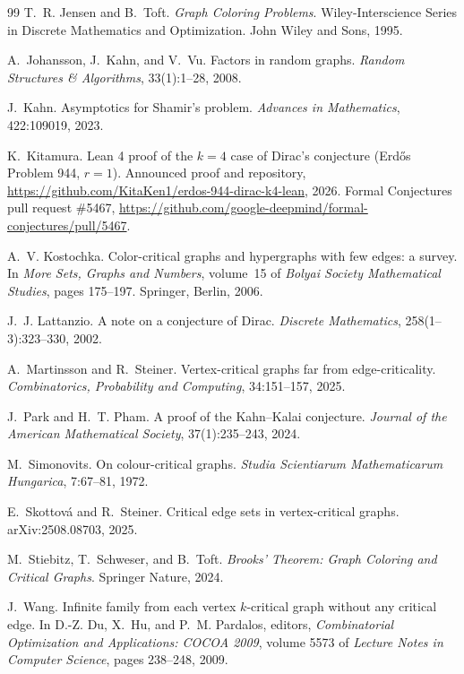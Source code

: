 \documentclass[11pt,letterpaper]{article}
\numberwithin{equation}{section}
\theoremstyle{plain}
\theoremstyle{definition}
\theoremstyle{remark}
\begin{document}
\begin{thebibliography}{99}
T.~R. Jensen and B.~Toft.
\emph{Graph Coloring Problems}.
Wiley-Interscience Series in Discrete Mathematics and Optimization. John Wiley and Sons, 1995.

A.~Johansson, J.~Kahn, and V.~Vu.
Factors in random graphs.
\emph{Random Structures \& Algorithms}, 33(1):1--28, 2008.

J.~Kahn.
Asymptotics for Shamir's problem.
\emph{Advances in Mathematics}, 422:109019, 2023.

K.~Kitamura.
Lean 4 proof of the $k=4$ case of Dirac's conjecture (Erd\H{o}s Problem 944, $r=1$).
Announced proof and repository, \url{https://github.com/KitaKen1/erdos-944-dirac-k4-lean}, 2026.
Formal Conjectures pull request \#5467, \url{https://github.com/google-deepmind/formal-conjectures/pull/5467}.

A.~V. Kostochka.
Color-critical graphs and hypergraphs with few edges: a survey.
In \emph{More Sets, Graphs and Numbers}, volume~15 of \emph{Bolyai Society Mathematical Studies}, pages 175--197. Springer, Berlin, 2006.

J.~J. Lattanzio.
A note on a conjecture of Dirac.
\emph{Discrete Mathematics}, 258(1--3):323--330, 2002.

A.~Martinsson and R.~Steiner.
Vertex-critical graphs far from edge-criticality.
\emph{Combinatorics, Probability and Computing}, 34:151--157, 2025.

J.~Park and H.~T. Pham.
A proof of the Kahn--Kalai conjecture.
\emph{Journal of the American Mathematical Society}, 37(1):235--243, 2024.

M.~Simonovits.
On colour-critical graphs.
\emph{Studia Scientiarum Mathematicarum Hungarica}, 7:67--81, 1972.

E.~Skottov\'a and R.~Steiner.
Critical edge sets in vertex-critical graphs.
arXiv:2508.08703, 2025.

M.~Stiebitz, T.~Schweser, and B.~Toft.
\emph{Brooks' Theorem: Graph Coloring and Critical Graphs}.
Springer Nature, 2024.

J.~Wang.
Infinite family from each vertex $k$-critical graph without any critical edge.
In D.-Z. Du, X.~Hu, and P.~M. Pardalos, editors, \emph{Combinatorial Optimization and Applications: COCOA 2009}, volume 5573 of \emph{Lecture Notes in Computer Science}, pages 238--248, 2009.

\end{thebibliography}
\end{document}
